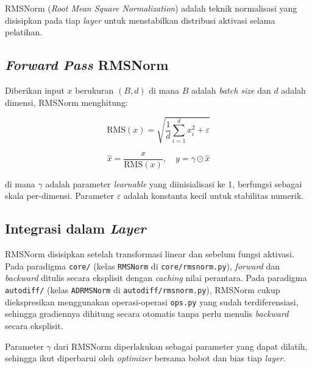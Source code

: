 RMSNorm (\textit{Root Mean Square Normalization}) adalah teknik normalisasi yang disisipkan pada tiap \textit{layer} untuk menstabilkan distribusi aktivasi selama pelatihan.

\subsection{\textit{Forward Pass} RMSNorm}

Diberikan input $x$ berukuran $(B, d)$ di mana $B$ adalah \textit{batch size} dan $d$ adalah dimensi, RMSNorm menghitung:

\begin{equation}
    \text{RMS}(x) = \sqrt{\frac{1}{d} \sum_{i=1}^{d} x_i^2 + \varepsilon}
    \label{eq:rms}
\end{equation}

\begin{equation}
    \hat{x} = \frac{x}{\text{RMS}(x)}, \quad y = \gamma \odot \hat{x}
    \label{eq:rmsnorm}
\end{equation}

di mana $\gamma$ adalah parameter \textit{learnable} yang diinisialisasi ke 1, berfungsi sebagai skala per-dimensi. Parameter $\varepsilon$ adalah konstanta kecil untuk stabilitas numerik.

\subsection{Integrasi dalam \textit{Layer}}

RMSNorm disisipkan setelah transformasi linear dan sebelum fungsi aktivasi. Pada paradigma \texttt{core/} (kelas \texttt{RMSNorm} di \texttt{core/rmsnorm.py}), \textit{forward} dan \textit{backward} ditulis secara eksplisit dengan \textit{caching} nilai perantara. Pada paradigma \texttt{autodiff/} (kelas \texttt{ADRMSNorm} di \texttt{autodiff/rmsnorm.py}), RMSNorm cukup diekspresikan menggunakan operasi-operasi \texttt{ops.py} yang sudah terdiferensiasi, sehingga gradiennya dihitung secara otomatis tanpa perlu menulis \textit{backward} secara eksplisit.

Parameter $\gamma$ dari RMSNorm diperlakukan sebagai parameter yang dapat dilatih, sehingga ikut diperbarui oleh \textit{optimizer} bersama bobot dan bias tiap \textit{layer}.